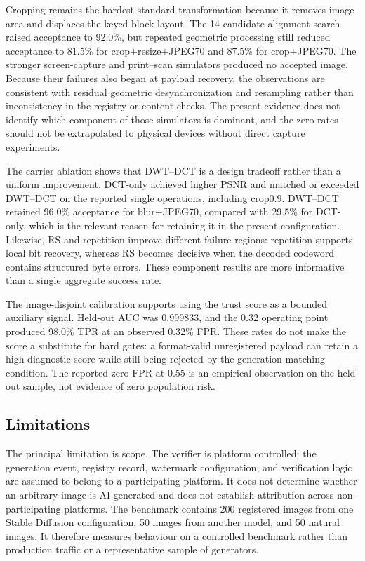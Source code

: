 \documentclass[a4paper,fleqn]{cas-sc}
\begin{document}
Cropping remains the hardest standard transformation because it removes image
area and displaces the keyed block layout. The 14-candidate alignment search
raised acceptance to 92.0\%, but repeated geometric processing still reduced
acceptance to 81.5\% for crop+resize+JPEG70 and 87.5\% for crop+JPEG70. The
stronger screen-capture and print--scan simulators produced no accepted image.
Because their failures also began at payload recovery, the observations are
consistent with residual geometric desynchronization and resampling rather
than inconsistency in the registry or content checks. The present evidence
does not identify which component of those simulators is dominant, and the
zero rates should not be extrapolated to physical devices without direct
capture experiments.

The carrier ablation shows that DWT--DCT is a design tradeoff rather than a
uniform improvement. DCT-only achieved higher PSNR and matched or exceeded
DWT--DCT on the reported single operations, including crop0.9. DWT--DCT
retained 96.0\% acceptance for blur+JPEG70, compared with 29.5\% for
DCT-only, which is the relevant reason for retaining it in the present
configuration. Likewise, RS and repetition improve different failure regions:
repetition supports local bit recovery, whereas RS becomes decisive when the
decoded codeword contains structured byte errors. These component results are
more informative than a single aggregate success rate.

The image-disjoint calibration supports using the trust score as a bounded
auxiliary signal. Held-out AUC was 0.999833, and the 0.32 operating point
produced 98.0\% TPR at an observed 0.32\% FPR. These rates do not make the
score a substitute for hard gates: a format-valid unregistered payload can
retain a high diagnostic score while still being rejected by the generation
matching condition. The reported zero FPR at 0.55 is an empirical observation
on the held-out sample, not evidence of zero population risk.

\subsection{Limitations}
The principal limitation is scope. The verifier is platform controlled: the
generation event, registry record, watermark configuration, and verification
logic are assumed to belong to a participating platform. It does not determine
whether an arbitrary image is AI-generated and does not establish attribution
across non-participating platforms. The benchmark contains 200 registered
images from one Stable Diffusion configuration, 50 images from another model,
and 50 natural images. It therefore measures behaviour on a controlled
benchmark rather than production traffic or a representative sample of
generators.
\end{document}
